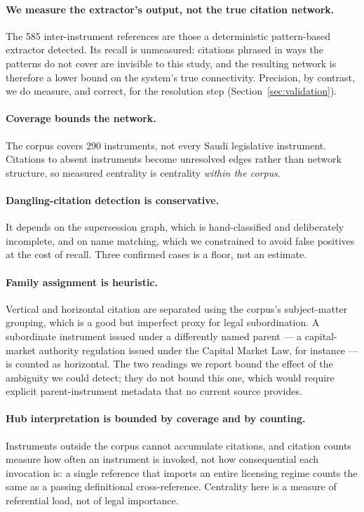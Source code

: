 \documentclass[sn-basic]{sn-jnl}%
\begin{document}
\paragraph{We measure the extractor's output, not the true citation network.}
The 585 inter-instrument references are those a deterministic pattern-based
extractor detected. Its recall is unmeasured: citations phrased in ways the
patterns do not cover are invisible to this study, and the resulting network
is therefore a lower bound on the system's true connectivity. Precision, by
contrast, we do measure, and correct, for the resolution step
(Section~\ref{sec:validation}).

\paragraph{Coverage bounds the network.}
The corpus covers 290 instruments, not every Saudi legislative instrument.
Citations to absent instruments become unresolved edges rather than network
structure, so measured centrality is centrality \emph{within the corpus}.

\paragraph{Dangling-citation detection is conservative.}
It depends on the supersession graph, which is hand-classified and
deliberately incomplete, and on name matching, which we constrained to avoid
false positives at the cost of recall. Three confirmed cases is a floor, not
an estimate.

\paragraph{Family assignment is heuristic.}
Vertical and horizontal citation are separated using the corpus's
subject-matter grouping, which is a good but imperfect proxy for legal
subordination. A subordinate instrument issued under a differently named
parent --- a capital-market authority regulation issued under the Capital
Market Law, for instance --- is counted as horizontal. The two readings we
report bound the effect of the ambiguity we could detect; they do not bound
this one, which would require explicit parent-instrument metadata that no
current source provides.

\paragraph{Hub interpretation is bounded by coverage and by counting.}
Instruments outside the corpus cannot accumulate citations, and citation
counts measure how often an instrument is invoked, not how consequential
each invocation is: a single reference that imports an entire licensing
regime counts the same as a passing definitional cross-reference. Centrality
here is a measure of referential load, not of legal importance.
\end{document}
